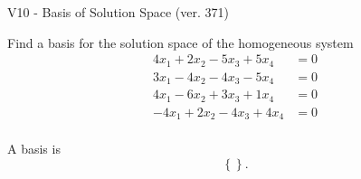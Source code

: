 \begin{exercise}
  \begin{exerciseTitle}V10 - Basis of Solution Space (ver. 371)\end{exerciseTitle}
  \begin{exerciseStatement}
    Find a basis for the solution space of the homogeneous system 
\begin{align*}
 4 x_ 1 + 2 x_ 2 -5 x_ 3 + 5 x_ 4 &= 0  \\ 
  3 x_ 1 -4 x_ 2 -4 x_ 3 -5 x_ 4 &= 0  \\ 
  4 x_ 1 -6 x_ 2 + 3 x_ 3 + 1 x_ 4 &= 0  \\ 
  -4 x_ 1 + 2 x_ 2 -4 x_ 3 + 4 x_ 4 &= 0  \\ 
 \end{align*}


 
  \end{exerciseStatement}

  \begin{exerciseAnswer}
   A basis is   
\[\left\{\right\}.\]

  


  \end{exerciseAnswer}
\end{exercise}